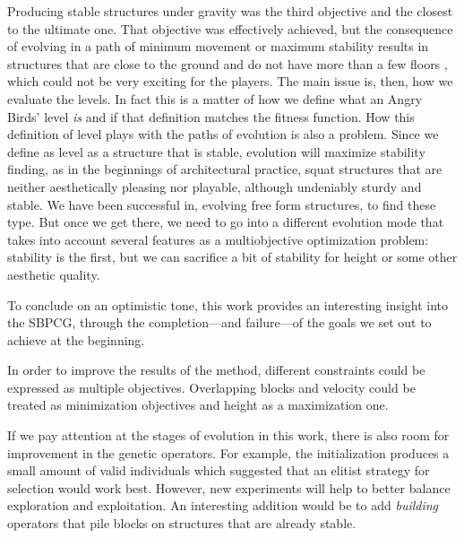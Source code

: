 \documentclass[sigconf]{acmart}
\begin{document}
Producing stable structures under gravity was the third objective and
the closest to the ultimate one. That objective was effectively
achieved, but the consequence of evolving in a path of minimum
movement or maximum stability results in structures that are close to
the ground and do not have more than a few floors , which could not be very 
exciting for the players. 
The main issue is, then, how we evaluate the levels. In fact this is 
a matter of how we define what an Angry Birds' level \textit{is} and if that 
definition matches the fitness function.
How this definition of level plays
with the paths of evolution is also a problem. Since we define as
level as a structure that is stable, evolution will maximize stability
finding, as in the beginnings of architectural practice, squat
structures that are neither aesthetically pleasing nor playable,
although undeniably sturdy and stable. We have been successful in,
evolving free form structures, to find these type. But once we get
there, we need to go into a different evolution mode that takes into
account several features as a multiobjective optimization problem:
stability is the first, but we can sacrifice a bit of stability for
height or some other aesthetic quality.


To conclude on an optimistic tone, this work provides an interesting insight 
into the SBPCG, through the completion---and failure---of the goals we
set out to achieve at the beginning.

In order to improve the results of the method, different constraints could be 
expressed as multiple objectives. Overlapping blocks and velocity could 
be treated as minimization objectives and height as a maximization one. %

If we pay attention at the stages of evolution in this work, there is also 
room for improvement in the genetic operators. For example, the initialization 
produces a small amount of valid individuals which suggested that an elitist 
strategy for selection would work best. However, new experiments will help to 
better balance exploration and exploitation. An interesting addition
would be to add {\em building} operators that pile blocks on
structures that are already stable. %
\end{document}
